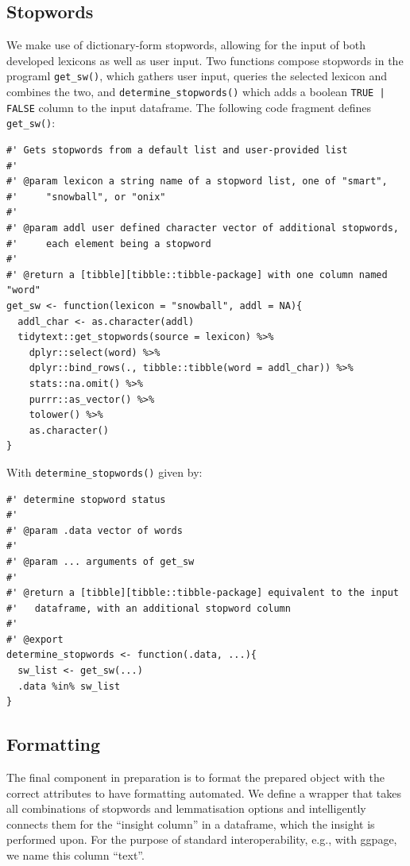 \documentclass[11pt, a4paper, oneside]{report}
\begin{document}
\subsection{Stopwords}
\label{sec:stopwords}
We make use of dictionary-form stopwords, allowing for the input of
both developed lexicons as well as user input. Two functions compose
stopwords in the programl \texttt{get_sw()}, which gathers user
input, queries the selected lexicon and combines the two, and
\texttt{determine_stopwords()} which adds a boolean
\texttt{TRUE | FALSE} column to the input dataframe. The
following code fragment defines \texttt{get_sw()}:
\begin{verbatim}
#' Gets stopwords from a default list and user-provided list
#'
#' @param lexicon a string name of a stopword list, one of "smart",
#'     "snowball", or "onix"
#'
#' @param addl user defined character vector of additional stopwords,
#'     each element being a stopword
#'
#' @return a [tibble][tibble::tibble-package] with one column named "word"
get_sw <- function(lexicon = "snowball", addl = NA){
  addl_char <- as.character(addl)
  tidytext::get_stopwords(source = lexicon) %>%
    dplyr::select(word) %>%
    dplyr::bind_rows(., tibble::tibble(word = addl_char)) %>%
    stats::na.omit() %>%
    purrr::as_vector() %>%
    tolower() %>%
    as.character()
}
\end{verbatim}

With \texttt{determine_stopwords()} given by:
\begin{verbatim}
#' determine stopword status
#'
#' @param .data vector of words
#'
#' @param ... arguments of get_sw
#'
#' @return a [tibble][tibble::tibble-package] equivalent to the input
#'   dataframe, with an additional stopword column
#'
#' @export
determine_stopwords <- function(.data, ...){
  sw_list <- get_sw(...)
  .data %in% sw_list
}
\end{verbatim}

\subsection{Formatting}
\label{sec:formatting}

The final component in preparation is to format the prepared object
with the correct attributes to have formatting automated. We define a
wrapper that takes all combinations of stopwords and lemmatisation
options and intelligently connects them for the ``insight column'' in
a dataframe, which the insight is performed upon. For the purpose of
standard interoperability, e.g., with ggpage, we name this column
``text''.
\end{document}
